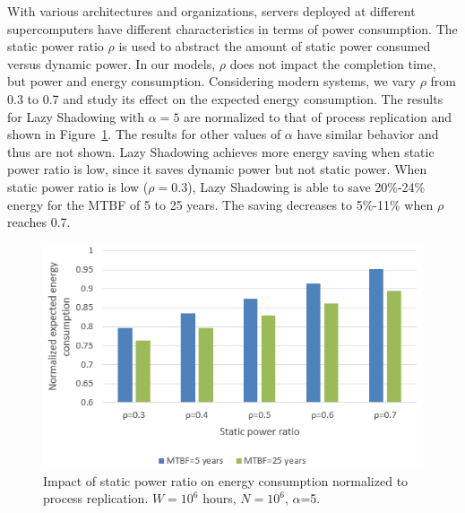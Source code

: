 With various architectures and organizations, servers deployed at
different supercomputers have different characteristics in terms of
power consumption. The static power ratio $\rho$ is used to abstract the
amount of static power consumed versus dynamic power. In our models,
$\rho$ does not impact the completion time, but power and energy consumption.
Considering modern systems, we vary $\rho$ from 0.3 to 0.7 and study its effect
on the expected energy consumption. The results for Lazy Shadowing with $\alpha=5$ are normalized to that of process replication and shown in 
Figure~\ref{fig:power_ratio}. The results for other values of $\alpha$ have similar behavior and thus are not shown. Lazy Shadowing achieves
more energy saving when static power ratio is low, since it saves dynamic 
power but not static power. When static power ratio is low ($\rho=0.3$), Lazy Shadowing
is able to save 20\%-24\% energy for the MTBF of 5 to 25 years. The saving decreases to 5\%-11\% when $\rho$ reaches 0.7. 

\begin{figure}[!t]
	\begin{center}
		\includegraphics[width=0.45\columnwidth]{Figures/s_power_5}
	\end{center}
	\caption{Impact of static power ratio on energy consumption normalized to process replication. $W=10^6$ hours, $N=10^6$, $\alpha$=5.}
	\label{fig:power_ratio}
\end{figure}
